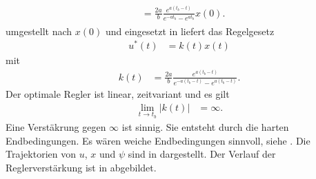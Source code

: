 \begin{exmp}
\begin{align}
\begin{split}
	& = \frac{2a}{b}\frac{e^{a(t_b-t)}}{e^{-at_b}-e^{at_b}} x(0).
\end{split}
\end{align}
 umgestellt nach $x(0)$ und eingesetzt in  liefert das Regelgesetz
\begin{align}
	u^{\ast}(t) & = k(t) x(t)
\end{align}
mit
\begin{align*}
	k(t) & = \frac{2a}{b}\frac{e^{a(t_b-t)}}{e^{-a(t_b-t)}-e^{a(t_b-t)}}.
\end{align*}
Der optimale Regler ist linear, zeitvariant und es gilt
\begin{align*}
	\lim\limits_{t\rightarrow t_b}\left|k(t)\right| & = \infty.
\end{align*}
Eine Verstäkrung gegen $\infty$ ist sinnig. Sie entsteht durch die harten Endbedingungen. Es wären weiche Endbedingungen sinnvoll, siehe
. Die Trajektorien von $u$, $x$ und $\psi$ sind in \figref{} dargestellt. Der Verlauf der Reglerverstärkung ist in
\figref{} abgebildet. 
\end{exmp}
\begin{exmp}\label{exmp:kap_2_vor_optlsg_2}

\end{exmp}


